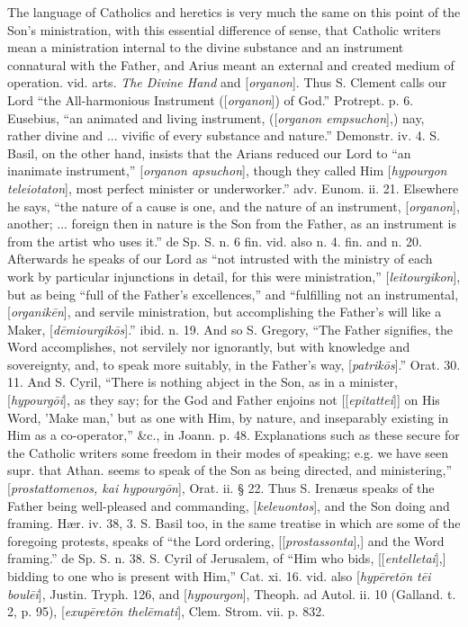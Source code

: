 The
language of Catholics and heretics is very much the same on this point
of the Son's ministration, with this essential difference of
sense, that Catholic writers mean a ministration internal to the
divine substance and an instrument connatural with the Father, and
Arius meant an external and created medium of operation. vid. arts. \emph{The
Divine Hand} and [\emph{organon}]. Thus S. Clement calls our Lord ``the
All-harmonious Instrument ([\emph{organon}]) of God.'' Protrept. p. 6.
Eusebius, ``an animated and living instrument, ([\emph{organon empsuchon}],)
nay, rather divine and ... vivific of every substance and nature.''
Demonstr. iv. 4. S. Basil, on the other hand, insists that the Arians
reduced our Lord to ``an inanimate instrument,'' [\emph{organon apsuchon}],
though they called Him [\emph{hypourgon teleiotaton}], most perfect
minister or underworker.'' adv. Eunom. ii. 21. Elsewhere he says, ``the
nature of a cause is one, and the nature of an instrument, [\emph{organon}],
another; ... foreign then in nature is the Son from the Father, as an
instrument is from the artist who uses it.'' de Sp. S. n. 6 fin. vid.
also n. 4. fin. and n. 20. Afterwards he speaks of our Lord as ``not
intrusted with the ministry of each work by particular injunctions in
detail, for this were ministration,'' [\emph{leitourgikon}], but as
being ``full of the Father's excellences,'' and ``fulfilling not an
instrumental, [\emph{organik\={e}n}], and servile ministration, but
accomplishing the Father's will like a Maker, [\emph{d\={e}miourgik\={o}s}].''
ibid. n. 19. And so S. Gregory, ``The Father signifies, the Word
accomplishes, not servilely nor ignorantly, but with knowledge and
sovereignty, and, to speak more suitably, in the Father's way, [\emph{patrik\={o}s}].''
Orat. 30. 11. And S. Cyril, ``There is nothing abject in the Son, as in
a minister, [\emph{hypourg\={o}i}], as they say; for the God
and Father enjoins not [[\emph{epitattei}]] on His Word, 'Make man,'
but as one with Him, by nature, and inseparably existing in Him as a
co-operator,'' \&c., in Joann. p. 48. Explanations such as these
secure for the Catholic writers some freedom in their modes of
speaking; e.g. we have seen supr. that Athan. seems to speak of the
Son as being directed, and ministering,'' [\emph{prostattomenos, kai
hypourg\={o}n}], Orat. ii. § 22. Thus S. Irenæus speaks of the
Father being well-pleased and commanding, [\emph{keleuontos}], and the
Son doing and framing. Hær. iv. 38, 3. S. Basil too, in the same
treatise in which are some of the foregoing protests, speaks of ``the
Lord ordering, [[\emph{prostassonta}],] and the Word framing.'' de Sp.
S. n. 38. S. Cyril of Jerusalem, of ``Him who bids, [[\emph{entelletai}],]
bidding to one who is present with Him,'' Cat. xi. 16. vid. also [\emph{hyp\={e}ret\={o}n
t\={e}i boul\={e}i}], Justin. Tryph. 126, and [\emph{hypourgon}],
Theoph. ad Autol. ii. 10 (Galland. t. 2, p. 95), [\emph{exup\={e}ret\={o}n
thel\={e}mati}], Clem. Strom. vii. p. 832.

